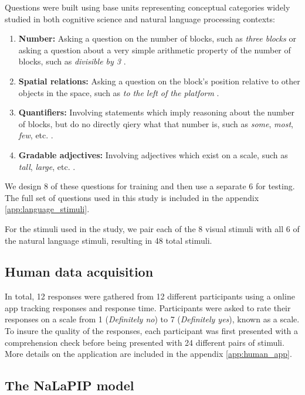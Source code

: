 \documentclass[10pt,letterpaper]{article}
\begin{document}
Questions were built using base units representing conceptual categories widely studied in both cognitive science and natural language processing contexts:
\begin{enumerate}
    \item \textbf{Number:} Asking a question on the number of blocks, such as \textit{three blocks} or asking a question about a very simple arithmetic property of the number of blocks, such as \textit{divisible by 3} \cite{bartsch1973semantics, gelman1978thechild}.
    \item \textbf{Spatial relations:} Asking a question on the block's position relative to other objects in the space, such as \textit{to the left of the platform} \cite{landau1993whence}. 
    \item \textbf{Quantifiers:} Involving statements which imply reasoning about the number of blocks, but do no directly qiery what that number is, such as \textit{some}, \textit{most}, \textit{few}, etc. \cite{montague1973proper, van2021probabilistic, barwise1981generalized}.
    \item \textbf{Gradable adjectives:} Involving adjectives which exist on a scale, such as \textit{tall}, \textit{large}, etc. \cite{klein1980semantics, lassiter2017adjectival}. 
\end{enumerate}
We design 8 of these questions for training and then use a separate 6 for testing. The full set of questions used in this study is included in the appendix \autoref{app:language_stimuli}. 

For the stimuli used in the study, we pair each of the 8 visual stimuli with all 6 of the natural language stimuli, resulting in 48 total stimuli.

\subsection{Human data acquisition} 

In total, 12 responses were gathered from 12 different participants using a online app tracking responses and response time. Participants were asked to rate their responses on a scale from 1 (\textit{Definitely no}) to 7 (\textit{Definitely yes}), known as a  scale. To insure the quality of the responses, each participant was first presented with a comprehension check before being presented with 24 different pairs of stimuli. More details on the application are included in the appendix \autoref{app:human_app}.

\subsection{The NaLaPIP model}
\end{document}
